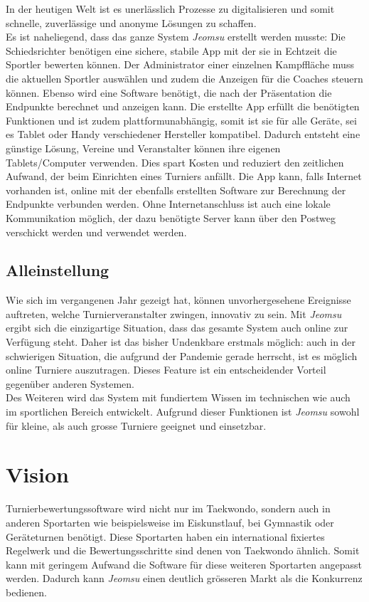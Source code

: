 In der heutigen Welt ist es unerlässlich Prozesse zu digitalisieren und somit schnelle,
    zuverlässige und anonyme Lösungen zu schaffen.
\\
Es ist naheliegend, dass das ganze System \textit{Jeomsu} erstellt werden musste:
Die Schiedsrichter benötigen eine sichere, stabile App mit der sie in Echtzeit die Sportler bewerten können.
Der Administrator einer einzelnen Kampffläche muss die aktuellen Sportler auswählen und zudem die Anzeigen für die Coaches steuern können.
Ebenso wird eine Software benötigt, die nach der Präsentation die Endpunkte berechnet und anzeigen kann. 
Die erstellte App erfüllt die benötigten Funktionen und ist zudem plattformunabhängig, somit ist sie für alle Geräte,
    sei es Tablet oder Handy verschiedener Hersteller kompatibel.
Dadurch entsteht eine günstige Lösung, Vereine und Veranstalter können ihre eigenen Tablets/Computer verwenden.
Dies spart Kosten und reduziert den zeitlichen Aufwand, der beim Einrichten eines Turniers anfällt.
Die App kann, falls Internet vorhanden ist, online mit der ebenfalls erstellten Software zur Berechnung der Endpunkte verbunden werden.
Ohne Internetanschluss ist auch eine lokale Kommunikation möglich, der dazu benötigte Server kann über den
    Postweg verschickt werden und verwendet werden.

\subsection{Alleinstellung}

Wie sich im vergangenen Jahr gezeigt hat, können unvorhergesehene Ereignisse auftreten, welche Turnierveranstalter
    zwingen, innovativ zu sein.
Mit \textit{Jeomsu} ergibt sich die einzigartige Situation, dass das gesamte System auch online zur Verfügung steht.
Daher ist das bisher Undenkbare erstmals möglich: auch in der schwierigen Situation, die aufgrund der Pandemie gerade
herrscht, ist es möglich online Turniere auszutragen.
Dieses Feature ist ein entscheidender Vorteil gegenüber anderen Systemen.
\\
Des Weiteren wird das System mit fundiertem Wissen im technischen wie auch im sportlichen Bereich entwickelt.
Aufgrund dieser Funktionen ist \textit{Jeomsu} sowohl für kleine, als auch grosse Turniere geeignet und einsetzbar.

\section{Vision}

Turnierbewertungssoftware wird nicht nur im Taekwondo, sondern auch in anderen Sportarten wie beispielsweise im Eiskunstlauf,
    bei Gymnastik oder Geräteturnen benötigt.
Diese Sportarten haben ein international fixiertes Regelwerk und die Bewertungsschritte sind denen von Taekwondo ähnlich.
Somit kann mit geringem Aufwand die Software für diese weiteren Sportarten angepasst werden.
Dadurch kann \textit{Jeomsu} einen deutlich grösseren Markt als die Konkurrenz bedienen.